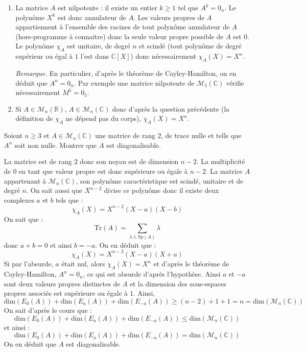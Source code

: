 \documentclass[a4paper,10pt]{report}
\begin{document}
\corr 

\begin{enumerate}
\item La matrice $A$ est nilpotente : il existe un entier $k \geq 1$ tel que $A^k = 0_n$. Le polynôme $X^k$ est donc annulateur de $A$. Les valeurs propres de $A$ appartiennent à l'ensemble des racines de tout polynôme annulateur de $A$ (hors-programme à connaitre) donc la seule valeur propre possible de $A$ est $0$. Le polynôme $\chi_A$ est unitaire, de degré $n$ et scindé (tout polynôme de degré supérieur ou égal à $1$ l'est dans $\mathbb{C}[X]$) donc nécessairement $\chi_A(X)=X^n$.

\medskip

\noindent \textit{Remarque.} En particulier, d'après le théorème de Cayley-Hamilton, on en déduit que $A^n=0_n$. Par exemple une matrice nilpotente de $\mathcal{M}_5(\mathbb{C})$ vérifie nécessairement $M^5=0_5$.
\item Si $A \in \mathcal{M}_n(\mathbb{R})$, $A \in \mathcal{M}_n(\mathbb{C})$ donc d'après la question précédente (la définition de $\chi_A$ ne dépend pas du corps), $\chi_A(X)=X^n$.
\end{enumerate}

\begin{Exercice}{} Soient $n \geq 3$ et $A \in \mathcal{M}_{n}(\mathbb{C})$ une matrice de rang $2$, de trace nulle et telle que $A^n$ soit non nulle. Montrer que $A$ est diagonalisable.
\end{Exercice}

\corr La matrice est de rang $2$ donc son noyau est de dimension $n-2$. La multiplicité de $0$ en tant que valeur propre est donc supérieure ou égale à $n-2$. La matrice $A$ appartenant à $\mathcal{M}_{n}(\mathbb{C})$, son polynôme caractéristique est scindé, unitaire et de degré $n$. On sait aussi que $X^{n-2}$ divise ce polynôme donc il existe deux complexes $a$ et $b$ tels que :
$$ \chi_A(X)= X^{n-2} (X-a)(X-b)$$
On sait que :
$$ \textrm{Tr}(A) = \sum_{\lambda \in \textrm{Sp}(A)} \lambda$$
donc $a+b=0$ et ainsi $b=-a$. On en déduit que :
$$ \chi_A(X)= X^{n-2} (X-a)(X+a)$$
Si par l'absurde, $a$ était nul, alors $\chi_A(X)=X^n$ et d'après le théorème de Cayley-Hamilton, $A^n= 0_n$, ce qui est absurde d'après l'hypothèse. Ainsi $a$ et $-a$ sont deux valeurs propres distinctes de $A$ et la dimension des sous-espaces propres associés est supérieure ou égale à $1$. Ainsi,
$$ \textrm{dim}(E_0(A)) + \textrm{dim}(E_a(A)) + \textrm{dim}(E_{-a}(A)) \geq (n-2)+1+1 = n = \textrm{dim}(\mathcal{M}_n(\mathbb{C}))$$
On sait d'après le cours que :
$$   \textrm{dim}(E_0(A)) + \textrm{dim}(E_a(A)) + \textrm{dim}(E_{-a}(A)) \leq \textrm{dim}(\mathcal{M}_n(\mathbb{C}))$$
et ainsi :
$$   \textrm{dim}(E_0(A)) + \textrm{dim}(E_a(A)) + \textrm{dim}(E_{-a}(A)) = \textrm{dim}(\mathcal{M}_n(\mathbb{C}))$$
On en déduit que $A$ est diagonalisable.
\end{document}
